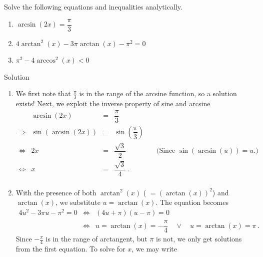 \begin{example}  Solve the following equations and inequalities analytically. 
	
	
	\begin{enumerate}
		
		\item  $\arcsin(2x) = \dfrac{\pi}{3}$
		
		\item  $4\arctan^2(x)-3\pi \arctan(x)-\pi^2 = 0$
		
		
		\item  $\pi^2-4\arccos^{2}(x) < 0$
		
	\end{enumerate}
	
	Solution 
	
	\begin{enumerate}
		
		\item  We first note that $\frac{\pi}{3}$ is in the range of the arcsine function,  so a solution exists! Next, we exploit the inverse property of sine and arcsine
		\renewcommand{\arraystretch}{2}%
		\[ \begin{array}{rrclr}
		
		&\arcsin(2x) & = & \dfrac{\pi}{3} & \\
		\Rightarrow&\sin\left(\arcsin(2x)\right) & = & \sin\left(\dfrac{\pi}{3}\right) & \\ [2pt]
		\Leftrightarrow&2x & = & \dfrac{\sqrt{3}}{2} & \quad\text{(Since $\sin(\arcsin(u)) = u$.)} \\ [2pt]
		\Leftrightarrow&x & = & \dfrac{\sqrt{3}}{4}\,. & \\ \end{array} \]
		\renewcommand{\arraystretch}{1}%
		
		\item  With the presence of both $\arctan^{2}(x)$ ( $= (\arctan(x))^2$) and $\arctan(x)$, we substitute $u = \arctan(x)$.  The equation becomes $$
		\begin{array}{rcl}
	4u^2 -3\pi u - \pi^2 = 0&\Leftrightarrow& (4u+\pi)(u - \pi) = 0\\[0.2cm]
	&\Leftrightarrow& u = \arctan(x) = -\dfrac{\pi}{4}\quad\vee\quad u = \arctan(x) = \pi\,.
	\end{array}$$  
		Since $-\frac{\pi}{4}$ is in the range of arctangent, but $\pi$ is not, we only get solutions from the first equation.  To solve for $x$, we may write
		\renewcommand{\arraystretch}{1.5}%
		\[ \begin{array}{rrclr}
		

\end{array}\]
\end{enumerate}
\end{example}
